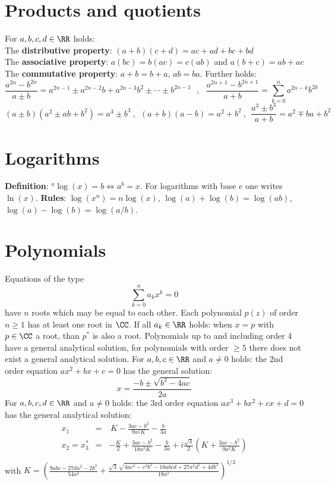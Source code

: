 \section{Products and quotients}
For $a,b,c,d\in\RR$ holds:\\
The {\bf distributive property}: $(a+b)(c+d)=ac+ad+bc+bd$\\
The {\bf associative property}: $a(bc)=b(ac)=c(ab)$ and $a(b+c)=ab+ac$\\
The {\bf commutative property}: $a+b=b+a$, $ab=ba$.
\npar
Further holds:
\[
\frac{a^{2n}-b^{2n}}{a\pm b}=a^{2n-1}\pm a^{2n-2}b+a^{2n-3}b^2\pm\cdots\pm b^{2n-1}~~~,~~~
\frac{a^{2n+1}-b^{2n+1}}{a+b}=\sum_{k=0}^n a^{2n-k}b^{2k}
\]
\[
(a\pm b)(a^2\pm ab+b^2)=a^3\pm b^3~,~~(a+b)(a-b)=a^2+b^2~,~~
\frac{a^3\pm b^3}{a+b}=a^2\mp ba+b^2
\]

\section{Logarithms}
{\bf Definition}: $^a\log(x)=b\Leftrightarrow a^b=x$. For logarithms with
base $e$ one writes $\ln(x)$.
\npar
{\bf Rules}: $\log(x^n)=n\log(x)$, $\log(a)+\log(b)=\log(ab)$, $\log(a)-\log(b)=\log(a/b)$.

\section{Polynomials}
Equations of the type
\[
\sum_{k=0}^n a_kx^k=0
\]
have $n$ roots which may be equal to each other. Each polynomial $p(z)$ of order
$n\geq1$ has at least one root in $\CC$. If all $a_k\in\RR$ holds: when
$x=p$ with $p\in\CC$ a root, than $p^*$ is also a root. Polynomials up to and
including order 4 have a general analytical solution, for polynomials with
order $\geq5$ there does not exist a general analytical solution.
\npar
For $a,b,c\in\RR$ and $a\neq0$ holds:
the 2nd order equation $ax^2+bx+c=0$ has the general solution:
\[
x=\frac{-b\pm\sqrt{b^2-4ac}}{2a}
\]
For $a,b,c,d\in\RR$ and $a\neq0$ holds:
the 3rd order equation $ax^3+bx^2+cx+d=0$ has the general analytical solution:
\begin{eqnarray*}
x_1&=&~K-\frac{3ac-b^2}{9a^2K}-\frac{b}{3a}\\
x_2=x_3^*&=&-\frac{K}{2}+\frac{3ac-b^2}{18a^2K}-\frac{b}{3a}+i\frac{\sqrt{3}}{2}\left(K+\frac{3ac-b^2}{9a^2K}\right)\\
\end{eqnarray*}
with $\displaystyle K=\left(\frac{9abc-27da^2-2b^3}{54a^3}+
\frac{\sqrt{3}\,\sqrt{4ac^3-c^2b^2-18abcd+27a^2d^2+4db^3}}{18a^2}\right)^{1/3}$

